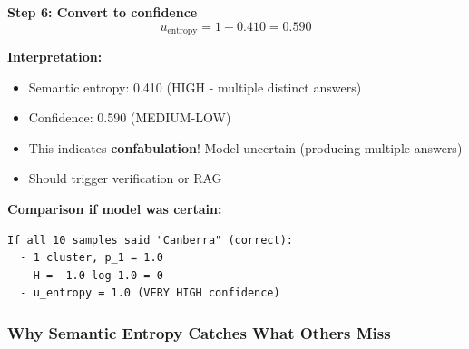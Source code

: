 \documentclass[12pt,a4paper]{article}
\theoremstyle{definition}
\begin{document}
\begin{examplebox}[title=Semantic Entropy on ``Capital of Australia'']
\textbf{Step 6: Convert to confidence}
\begin{equation}
u_{\text{entropy}} = 1 - 0.410 = 0.590
\end{equation}

\textbf{Interpretation:}
\begin{itemize}
    \item Semantic entropy: 0.410 (HIGH - multiple distinct answers)
    \item Confidence: 0.590 (MEDIUM-LOW)
    \item This indicates \textbf{confabulation}! Model uncertain (producing multiple answers)
    \item Should trigger verification or RAG
\end{itemize}

\textbf{Comparison if model was certain:}
\begin{verbatim}
If all 10 samples said "Canberra" (correct):
  - 1 cluster, p_1 = 1.0
  - H = -1.0 log 1.0 = 0
  - u_entropy = 1.0 (VERY HIGH confidence)
\end{verbatim}
\end{examplebox}

\subsubsection{Why Semantic Entropy Catches What Others Miss}
\end{document}

